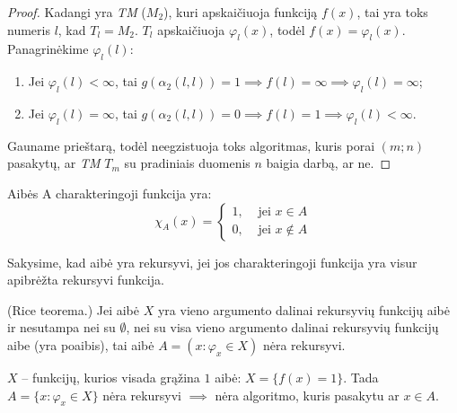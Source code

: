 \begin{prop}
\begin{proof}
    Kadangi yra \emph{TM} ($M_{2}$), kuri apskaičiuoja funkciją $f(x)$,
    tai yra toks numeris $l$, kad $T_{l} = M_{2}$. $T_{l}$ apskaičiuoja
    $\varphi_{l}(x)$, todėl $f(x) = \varphi_{l}(x)$. Panagrinėkime 
    $\varphi_{l}(l)$:
    \begin{enumerate}
      \item Jei $\varphi_{l}(l) < \infty$, tai 
        $g(\alpha_{2}(l,l)) = 1 \implies f(l) = \infty \implies%
        \varphi_{l}(l) = \infty$;
      \item Jei $\varphi_{l}(l) = \infty$, tai 
        $g(\alpha_{2}(l,l)) = 0 \implies f(l) = 1 \implies%
        \varphi_{l}(l) < \infty$.
    \end{enumerate}
    Gauname prieštarą, todėl neegzistuoja toks algoritmas, kuris 
    porai $(m;n)$ pasakytų, ar \emph{TM} $T_{m}$ su pradiniais duomenis
    $n$ baigia darbą, ar ne.
  \end{proof}
\end{prop}

\begin{defn}
  Aibės A charakteringoji funkcija yra:
  \[
  \chi _{A}(x) =%
  \begin{cases}
    1, & \text{ jei } x \in A \\
    0, & \text{ jei } x \not \in A
  \end{cases}
  \]
\end{defn}

\begin{defn}
  Sakysime, kad aibė yra rekursyvi, jei jos charakteringoji funkcija yra
  visur apibrėžta rekursyvi funkcija.
\end{defn}

\begin{note}
  (Rice teorema.) Jei aibė $X$ yra vieno argumento dalinai rekursyvių
  funkcijų aibė ir nesutampa nei su $\emptyset$, nei su visa vieno
  argumento dalinai rekursyvių funkcijų aibe (yra poaibis), tai 
  aibė $A = (x : \varphi_{x} \in X)$ nėra rekursyvi.
  \begin{exmp}
    $X$ – funkcijų, kurios visada grąžina $1$ aibė: $X = \{ f(x) = 1 \}$.
    Tada $A = \{ x : \varphi_{x} \in X \}$ nėra rekursyvi $\implies$
    nėra algoritmo, kuris pasakytu ar $x \in A$.
  \end{exmp}
\end{note}

